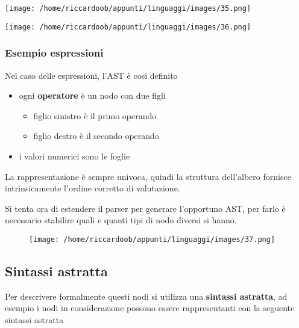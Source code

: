 \begin{multicols}{2}    
    \begin{multicolfigure}
        \centering
        \texttt{[image: /home/riccardoob/appunti/linguaggi/images/35.png]}
    \end{multicolfigure}
    \columnbreak
    \begin{multicolfigure}
        \centering
        \texttt{[image: /home/riccardoob/appunti/linguaggi/images/36.png]}
    \end{multicolfigure}
\end{multicols}

\subsubsection{Esempio espressioni}

Nel caso delle espressioni, l'AST è così definito
\begin{itemize}
    \item ogni \textbf{operatore} è un nodo con due figli
    \begin{itemize}
        \item figlio sinistro è il primo operando
        \item figlio destro è il secondo operando
    \end{itemize}
    \item i valori numerici sono le foglie
\end{itemize}

La rappresentazione è sempre univoca, quindi la struttura dell'albero fornisce intrinsicamente l'ordine corretto di valutazione.

Si tenta ora di estendere il parser per generare l'opportuno AST, per farlo è necessario stabilire quali e quanti tipi di nodo diversi si hanno.

\begin{figure}[H]
    \centering
    \texttt{[image: /home/riccardoob/appunti/linguaggi/images/37.png]}
\end{figure}

\subsection{Sintassi astratta}
Per descrivere formalmente questi nodi si utilizza una \textbf{sintassi astratta}, ad esempio i nodi in considerazione possono essere rappresentanti con la seguente sintassi astratta

